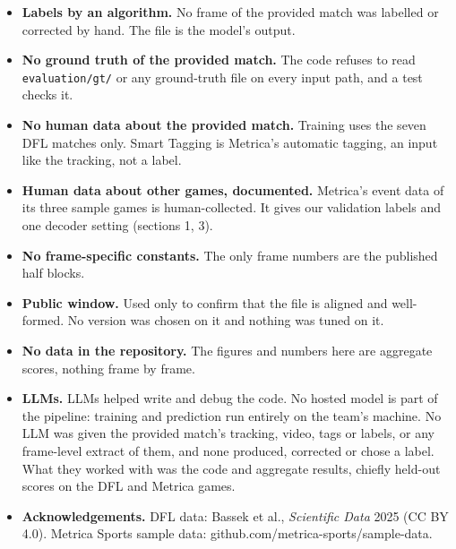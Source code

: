 \documentclass[10pt,a4paper]{article}
\begin{document}
\begin{itemize}\setlength{\itemsep}{2pt}

\item \textbf{Labels by an algorithm.} No frame of the provided match was labelled or corrected by
  hand. The file is the model's output.

\item \textbf{No ground truth of the provided match.} The code refuses to read \texttt{evaluation/gt/} or any
  ground-truth file on every input path, and a test checks it.

\item \textbf{No human data about the provided match.} Training uses the seven DFL matches only. Smart
  Tagging is Metrica's automatic tagging, an input like the tracking, not a label.

\item \textbf{Human data about other games, documented.} Metrica's event data of its three sample games
  is human-collected. It gives our validation labels and one decoder setting (sections 1, 3).

\item \textbf{No frame-specific constants.} The only frame numbers are the published half blocks.

\item \textbf{Public window.} Used only to confirm that the file is aligned and well-formed. No version
  was chosen on it and nothing was tuned on it.

\item \textbf{No data in the repository.} The figures and numbers here are aggregate scores, nothing
  frame by frame.

\item \textbf{LLMs.} LLMs helped write and debug the code. No hosted model is part of the pipeline:
  training and prediction run entirely on the team's machine. No LLM was given the provided
  match's tracking, video, tags or labels, or any frame-level extract of them, and none
  produced, corrected or chose a label. What they worked with was the code and aggregate
  results, chiefly held-out scores on the DFL and Metrica games.

\item \textbf{Acknowledgements.} DFL data: Bassek et al., \emph{Scientific Data} 2025 (CC BY 4.0). Metrica
  Sports sample data: github.com/metrica-sports/sample-data.

\end{itemize}
\end{document}
